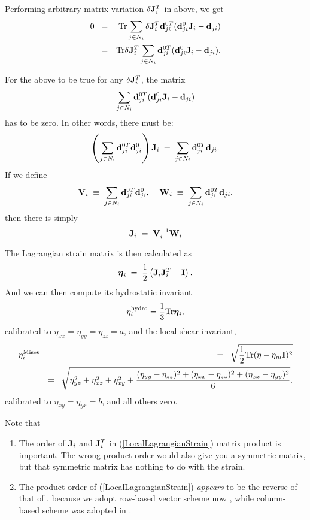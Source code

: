\documentclass[12pt]{article}
\def\bmath#1{\mbox{\boldmath$#1$}}
\begin{document}
Performing arbitrary matrix variation $\delta {\bf J}_i^T$ in above,
we get
\begin{eqnarray}
 0 \;\;=&& 
{\rm Tr} \sum_{j\in N_i} \delta{\bf J}_i^T {\bf d}_{ji}^{0T} 
({\bf d}_{ji}^0{\bf J}_i - {\bf d}_{ji})  \nonumber\\
=&& {\rm Tr} \delta{\bf J}_i^T \sum_{j\in N_i} {\bf d}_{ji}^{0T} 
({\bf d}_{ji}^0{\bf J}_i - {\bf d}_{ji}).
\end{eqnarray}

For the above to be true for any $\delta {\bf J}_i^T$, the matrix
\begin{equation}
  \sum_{j\in N_i} {\bf d}_{ji}^{0T} 
({\bf d}_{ji}^0{\bf J}_i - {\bf d}_{ji})
\end{equation}
has to be zero. In other words, there must be:
\begin{equation}
  \left(\sum_{j\in N_i} {\bf d}_{ji}^{0T} {\bf d}_{ji}^0\right) 
  {\bf J}_i \;=\; \sum_{j\in N_i} {\bf d}_{ji}^{0T} {\bf d}_{ji}.
\end{equation}
If we define
\begin{equation}
 {\bf V}_i \;\equiv\; \sum_{j\in N_i} {\bf d}_{ji}^{0T} {\bf
 d}_{ji}^0, \;\;\;\; 
 {\bf W}_i \;\equiv\; \sum_{j\in N_i} {\bf d}_{ji}^{0T} {\bf
 d}_{ji},
\end{equation}
then there is simply
\begin{equation}
 {\bf J}_i \;=\; {\bf V}_i^{-1} {\bf W}_i
\end{equation}

The Lagrangian strain matrix is then calculated as
\begin{equation}
 \bmath{\eta}_i \;=\; \frac{1}{2}\left({\bf J}_i {\bf J}_i^T - {\bf
 I}\right).
 \label{LocalLagrangianStrain}
\end{equation}
And we can then compute its hydrostatic invariant
\begin{equation}
 \eta^{\rm hydro}_i = \frac{1}{3} {\rm Tr} \bmath{\eta}_i,
\end{equation}
calibrated to $\eta_{xx}=\eta_{yy}=\eta_{zz}=a$, and the local shear
invariant,
\begin{eqnarray}
 \eta^{\rm Mises}_i &&=\;\; \sqrt{\frac{1}{2} 
{\rm Tr} ( \eta - \eta_m {\bf I} )^2} \nonumber \\
&&=\;\; \sqrt{\eta_{yz}^2+\eta_{xz}^2+\eta_{xy}^2+
\frac{(\eta_{yy}-\eta_{zz})^2+(\eta_{xx}-\eta_{zz})^2+(\eta_{xx}-\eta_{yy})^2}
{6} }.
\end{eqnarray}
calibrated to $\eta_{xy}=\eta_{yx}=b$, and all others zero.

Note that
\begin{enumerate}
 \item The order of ${\bf J}_i$ and ${\bf J}_i^T$ in
 (\ref{LocalLagrangianStrain}) matrix product is important. The wrong
 product order would also give you a symmetric matrix, but that
 symmetric matrix has nothing to do with the strain.
 \item The product order of (\ref{LocalLagrangianStrain}) {\em
 appears} to be the reverse of that of \cite{WangLYPW95}, because we
 adopt row-based vector scheme now
 \cite{Li05-2.8,Li05-2.19,Li05-2.31}, while column-based scheme was
 adopted in \cite{WangLYPW95}.
\end{enumerate}


\end{document}
